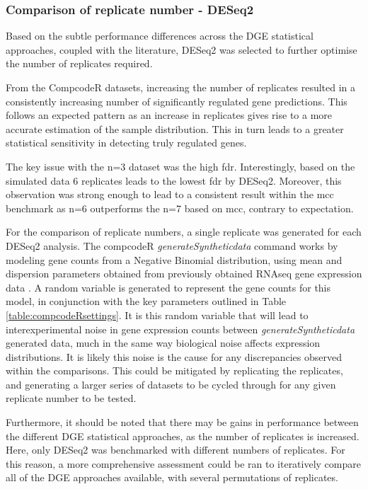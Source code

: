 \subsubsection{Comparison of replicate number - DESeq2}

Based on the subtle performance differences across the DGE statistical approaches, coupled with the literature, DESeq2 was selected to further optimise the number of replicates required. 

From the CompcodeR datasets, increasing the number of replicates resulted in a consistently increasing number of significantly regulated gene predictions. This follows an expected pattern as an increase in replicates gives rise to a more accurate estimation of the sample distribution. This in turn leads to a greater statistical sensitivity in detecting truly regulated genes. 

The key issue with the n=3 dataset was the high \acrshort{fdr}. Interestingly, based on the simulated data 6 replicates leads to the lowest \acrshort{fdr} by DESeq2. Moreover, this observation was strong enough to lead to a consistent result within the \acrshort{mcc} benchmark as n=6 outperforms the n=7 based on \acrshort{mcc}, contrary to expectation.

For the comparison of replicate numbers, a single replicate was generated for each DESeq2 analysis. The compcodeR \textit{generateSyntheticdata} command works by modeling gene counts from a Negative Binomial distribution, using mean and dispersion parameters obtained from previously obtained RNAseq gene expression data \cite{Soneson2013}. A random variable is generated to represent the gene counts for this model, in conjunction with the key parameters outlined in Table \ref{table:compcodeRsettings}. It is this random variable that will lead to interexperimental noise in gene expression counts between \textit{generateSyntheticdata} generated data, much in the same way biological noise affects expression distributions. It is likely this noise is the cause for any discrepancies observed within the comparisons. This could be mitigated by replicating the replicates, and generating a larger series of datasets to be cycled through for any given replicate number to be tested.

Furthermore, it should be noted that there may be gains in performance between the different DGE statistical approaches, as the number of replicates is increased. Here, only DESeq2 was benchmarked with different numbers of replicates. For this reason, a more comprehensive assessment could be ran to iteratively compare all of the DGE approaches available, with several permutations of replicates. 

